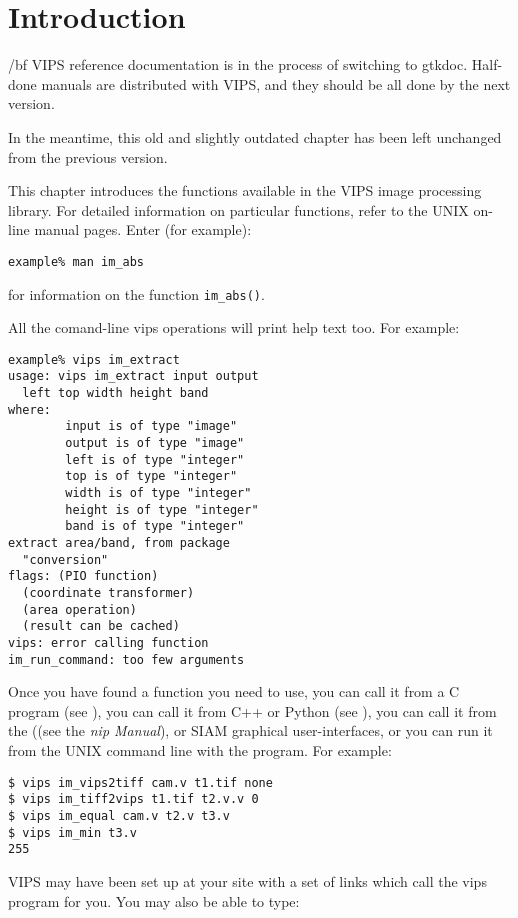 \section{Introduction}

{/bf
VIPS reference documentation is in the process of switching to gtkdoc.
Half-done manuals are distributed with VIPS, and they should be all done by
the next version.

In the meantime, this old and slightly outdated chapter has been left
unchanged from the previous version.
}

This chapter introduces the functions available in the VIPS image
processing library.  For detailed information on particular functions,
refer to the UNIX on-line manual pages. Enter (for example):

\begin{verbatim}
example% man im_abs   
\end{verbatim}

for information on the function \verb+im_abs()+.

All the comand-line vips operations will print help text too. For example:

\begin{verbatim}
example% vips im_extract
usage: vips im_extract input output 
  left top width height band
where:
        input is of type "image"
        output is of type "image"
        left is of type "integer"
        top is of type "integer"
        width is of type "integer"
        height is of type "integer"
        band is of type "integer"
extract area/band, from package 
  "conversion"
flags: (PIO function) 
  (coordinate transformer) 
  (area operation) 
  (result can be cached)
vips: error calling function
im_run_command: too few arguments
\end{verbatim}

Once you have found a function you need to use, you can call it from a C
program (see ), you can call
it from C++ or Python (see ), you can call
it from the \nip{} ((see the \emph{nip Manual}), or SIAM graphical
user-interfaces, or you can run it from the UNIX command line with the
\vips{} program. For example:

\begin{verbatim}
$ vips im_vips2tiff cam.v t1.tif none
$ vips im_tiff2vips t1.tif t2.v.v 0
$ vips im_equal cam.v t2.v t3.v
$ vips im_min t3.v
255   
\end{verbatim}

VIPS may have been set up at your site with a set of links which call the
vips program for you. You may also be able to type:

